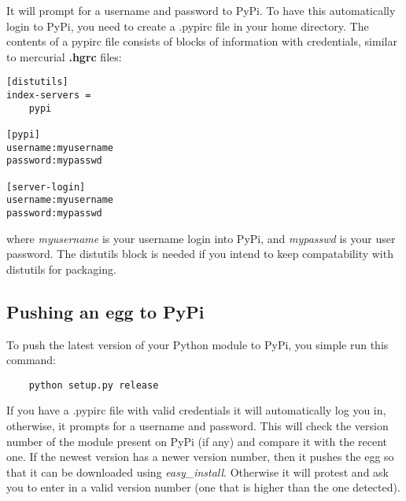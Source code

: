 \documentclass[12pt]{article}
\begin{document}
It will prompt for a username and password to PyPi. To have this automatically login to PyPi, you need to create a .pypirc file in your home directory. The contents of a pypirc file consists of blocks of information with credentials, similar to mercurial {\bf .hgrc} files:

\begin{verbatim}
[distutils]
index-servers =
    pypi

[pypi]
username:myusername
password:mypasswd

[server-login]
username:myusername
password:mypasswd
\end{verbatim}

where {\it myusername} is your username login into PyPi, and {\it mypasswd} is your user password. The distutils block is needed if you intend to keep compatability with distutils for packaging. 

\subsection*{Pushing an egg to PyPi}

	To push the latest version of your Python module to PyPi, you simple run this command:
	
\begin{verbatim}
	python setup.py release
\end{verbatim}

If you have a .pypirc file with valid credentials it will automatically log you in, otherwise, it prompts for a username and password. This will check the version number of the module present on PyPi (if any) and compare it with the recent one. If the newest version has a newer version number, then it pushes the egg so that it can be downloaded using {\it easy\_install}. Otherwise it will protest and ask you to enter in a valid version number (one that is higher than the one detected). 
\end{document}
